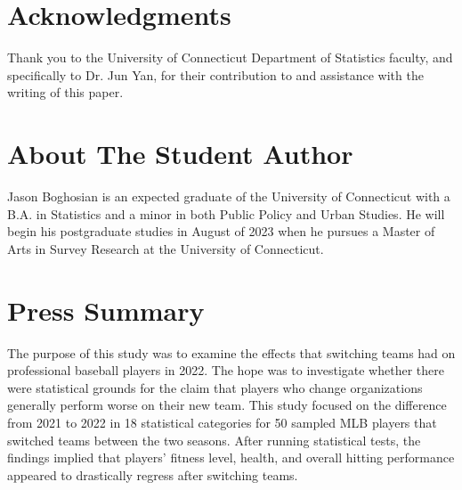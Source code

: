 \documentclass[10pt]{article}
\begin{document}



\section{Acknowledgments}

Thank you to the University of Connecticut Department of Statistics faculty, and specifically to Dr. Jun Yan, for their 
contribution to and assistance with the writing of this paper.

\section{About The Student Author}

Jason Boghosian is an expected graduate of the University of Connecticut with a B.A. in Statistics and a minor in both 
Public Policy and Urban Studies. He will begin his postgraduate studies in August of 2023 when he pursues a Master of Arts 
in Survey Research at the University of Connecticut.

\section{Press Summary}

The purpose of this study was to examine the effects that switching teams had on professional baseball players in 2022. The 
hope was to investigate whether there were statistical grounds for the claim that players who change organizations generally 
perform worse on their new team. This study focused on the difference from 2021 to 2022 in 18 statistical categories for 50 
sampled MLB players that switched teams between the two seasons. After running statistical tests, the findings implied  
that players’ fitness level, health, and overall hitting performance appeared to drastically regress after switching teams.
\end{document}

